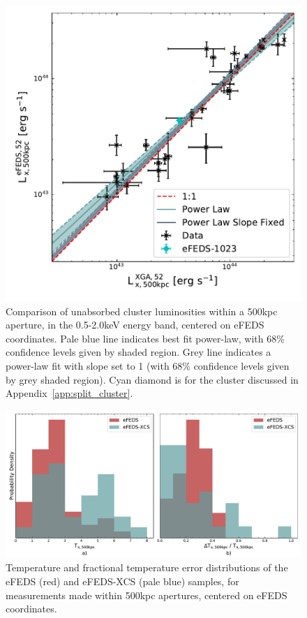 \documentclass[fleqn,usenatbib]{mnras}
\begin{document}
\begin{figure}
    \centering
    \includegraphics[width=0.95\columnwidth]{images/efeds_xcs_l500cal.pdf}
    \caption[]{Comparison of unabsorbed cluster luminosities within a 500kpc aperture, in the 0.5-2.0keV energy band, centered on eFEDS coordinates. Pale blue line indicates best fit power-law, with 68\% confidence levels given by shaded region. Grey line indicates a power-law fit with slope set to 1 (with 68\% confidence levels given by grey shaded region). Cyan diamond is for the cluster discussed in Appendix~\ref{app:split_cluster}.}
    \label{fig:l500kpccomp}
\end{figure}

\begin{figure}
    \centering
    \includegraphics[width=1.0\textwidth]{images/efeds_xcs_txcomp.pdf}
    \caption[]{Temperature and fractional temperature error distributions of the eFEDS (red) and eFEDS-XCS (pale blue) samples, for measurements made within 500kpc apertures, centered on eFEDS coordinates. } 
    \label{fig:efedsxmmtxdist}
\end{figure}
\end{document}
